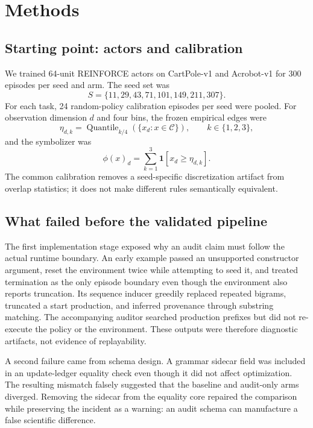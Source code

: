 \documentclass[11pt,a4paper]{article}
\begin{document}
\section{Methods}
\label{sec:methods}

\subsection{Starting point: actors and calibration}
We trained 64-unit REINFORCE actors on CartPole-v1 and Acrobot-v1 for 300 episodes per seed and arm. The seed set was
\[
 S=\{11,29,43,71,101,149,211,307\}.
\]
For each task, 24 random-policy calibration episodes per seed were pooled. For observation dimension $d$ and four bins, the frozen empirical edges were
\begin{equation}
\eta_{d,k}=\operatorname{Quantile}_{k/4}(\{x_d:x\in\mathcal C\}),\qquad k\in\{1,2,3\},
\label{eq:edges}
\end{equation}
and the symbolizer was
\begin{equation}
\phi(x)_d=\sum_{k=1}^{3}\mathbf{1}[x_d\geq\eta_{d,k}].
\label{eq:symbolizer}
\end{equation}
The common calibration removes a seed-specific discretization artifact from overlap statistics; it does not make different rules semantically equivalent.

\subsection{What failed before the validated pipeline}
The first implementation stage exposed why an audit claim must follow the actual runtime boundary. An early example passed an unsupported constructor argument, reset the environment twice while attempting to seed it, and treated termination as the only episode boundary even though the environment also reports truncation. Its sequence inducer greedily replaced repeated bigrams, truncated a start production, and inferred provenance through substring matching. The accompanying auditor searched production prefixes but did not re-execute the policy or the environment. These outputs were therefore diagnostic artifacts, not evidence of replayability.

A second failure came from schema design. A grammar sidecar field was included in an update-ledger equality check even though it did not affect optimization. The resulting mismatch falsely suggested that the baseline and audit-only arms diverged. Removing the sidecar from the equality core repaired the comparison while preserving the incident as a warning: an audit schema can manufacture a false scientific difference.
\end{document}
